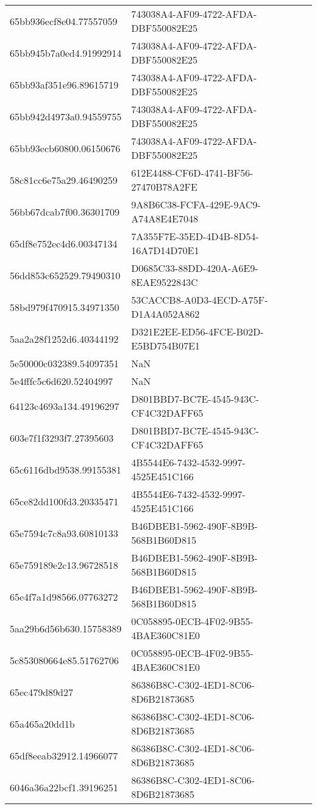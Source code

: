 \begin{tabular}{ll}
65bb936ecf8e04.77557059 & 743038A4-AF09-4722-AFDA-DBF550082E25 \\
65bb945b7a0ed4.91992914 & 743038A4-AF09-4722-AFDA-DBF550082E25 \\
65bb93af351e96.89615719 & 743038A4-AF09-4722-AFDA-DBF550082E25 \\
65bb942d4973a0.94559755 & 743038A4-AF09-4722-AFDA-DBF550082E25 \\
65bb93ecb60800.06150676 & 743038A4-AF09-4722-AFDA-DBF550082E25 \\
58c81cc6e75a29.46490259 & 612E4488-CF6D-4741-BF56-27470B78A2FE \\
56bb67dcab7f00.36301709 & 9A8B6C38-FCFA-429E-9AC9-A74A8E4E7048 \\
65df8e752ec4d6.00347134 & 7A355F7E-35ED-4D4B-8D54-16A7D14D70E1 \\
56dd853c652529.79490310 & D0685C33-88DD-420A-A6E9-8EAE9522843C \\
58bd979f470915.34971350 & 53CACCB8-A0D3-4ECD-A75F-D1A4A052A862 \\
5aa2a28f1252d6.40344192 & D321E2EE-ED56-4FCE-B02D-E5BD754B07E1 \\
5e50000c032389.54097351 & NaN \\
5e4fffc5c6d620.52404997 & NaN \\
64123c4693a134.49196297 & D801BBD7-BC7E-4545-943C-CF4C32DAFF65 \\
603e7f1f3293f7.27395603 & D801BBD7-BC7E-4545-943C-CF4C32DAFF65 \\
65c6116dbd9538.99155381 & 4B5544E6-7432-4532-9997-4525E451C166 \\
65ce82dd100fd3.20335471 & 4B5544E6-7432-4532-9997-4525E451C166 \\
65e7594c7c8a93.60810133 & B46DBEB1-5962-490F-8B9B-568B1B60D815 \\
65e759189e2c13.96728518 & B46DBEB1-5962-490F-8B9B-568B1B60D815 \\
65e4f7a1d98566.07763272 & B46DBEB1-5962-490F-8B9B-568B1B60D815 \\
5aa29b6d56b630.15758389 & 0C058895-0ECB-4F02-9B55-4BAE360C81E0 \\
5c853080664e85.51762706 & 0C058895-0ECB-4F02-9B55-4BAE360C81E0 \\
65ec479d89d27 & 86386B8C-C302-4ED1-8C06-8D6B21873685 \\
65a465a20dd1b & 86386B8C-C302-4ED1-8C06-8D6B21873685 \\
65df8eeab32912.14966077 & 86386B8C-C302-4ED1-8C06-8D6B21873685 \\
6046a36a22bcf1.39196251 & 86386B8C-C302-4ED1-8C06-8D6B21873685 \\

\end{tabular}
